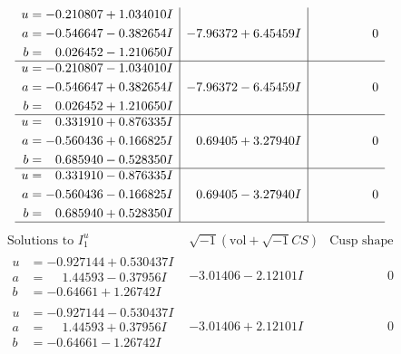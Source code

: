 \documentclass[1p]{elsarticle_modified}
\theoremstyle{definition}
\newcommand{\I}{\sqrt{-1}}
\begin{document}
$$\begin{array}{c|c|c}
\begin{aligned}
u &= -0.210807 + 1.034010 I \\
a &= -0.546647 - 0.382654 I \\
b &= \phantom{-}0.026452 - 1.210650 I\end{aligned}
 & -7.96372 + 6.45459 I & \phantom{-0.000000 } 0 \\ \hline\begin{aligned}
u &= -0.210807 - 1.034010 I \\
a &= -0.546647 + 0.382654 I \\
b &= \phantom{-}0.026452 + 1.210650 I\end{aligned}
 & -7.96372 - 6.45459 I & \phantom{-0.000000 } 0 \\ \hline\begin{aligned}
u &= \phantom{-}0.331910 + 0.876335 I \\
a &= -0.560436 + 0.166825 I \\
b &= \phantom{-}0.685940 - 0.528350 I\end{aligned}
 & \phantom{-}0.69405 + 3.27940 I & \phantom{-0.000000 } 0 \\ \hline\begin{aligned}
u &= \phantom{-}0.331910 - 0.876335 I \\
a &= -0.560436 - 0.166825 I \\
b &= \phantom{-}0.685940 + 0.528350 I\end{aligned}
 & \phantom{-}0.69405 - 3.27940 I & \phantom{-0.000000 } 0\\
 \hline 
 \end{array}$$\newpage$$\begin{array}{c|c|c}  
\text{Solutions to }I^u_{1}& \I (\text{vol} + \sqrt{-1}CS) & \text{Cusp shape}\\
 \hline 
\begin{aligned}
u &= -0.927144 + 0.530437 I \\
a &= \phantom{-}1.44593 - 0.37956 I \\
b &= -0.64661 + 1.26742 I\end{aligned}
 & -3.01406 - 2.12101 I & \phantom{-0.000000 } 0 \\ \hline\begin{aligned}
u &= -0.927144 - 0.530437 I \\
a &= \phantom{-}1.44593 + 0.37956 I \\
b &= -0.64661 - 1.26742 I\end{aligned}
 & -3.01406 + 2.12101 I & \phantom{-0.000000 } 0 \\ \hline\begin{aligned}

\end{aligned}
\end{array}$$
\end{document}
